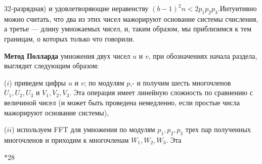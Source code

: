 \documentclass{mai_book}
\begin{document}
32-разрядная) и удовлетворяющие неравенству $(b - 1)^{2}n < 2p_{1}p_{2}p_{3}$.Интуитивно можно считать, что два из этих чисел мажорируют основание системы счисления, а третье --- длину умножаемых чисел, и, таким образом, мы
приблизимся к тем границам, о которых только что говорили. \par
   \textbf{Метод Полларда} умножения двух чисел $u$ и $v$, при обозначениях
начала раздела, выглядит следующим образом: \par
($i$) приведем цифры $u$ и $v$; по модулям $p$,- и получим шесть 
многочленов $U_{1}, U_{2}, U_{3}$ и $V_{1},V_{2}, V_{3}$. Эта операция имеет линейную сложность по сравнению с величиной чисел (и может быть проведена немедленно, если простые числа мажорируют основание системы),\par
($ii$) используем FFT для умножения по модулям $p_{1}, p_{2}, p_{3}$ трех пар\linebreak
полученных многочленов и приходим к многочленам $W_{1}, W_{2}, W_{3}$. Эта \linebreak
\begin{flushleft}
\scriptsize
*28
\end{flushleft}

\pagebreak
\newpage

\end{document}
